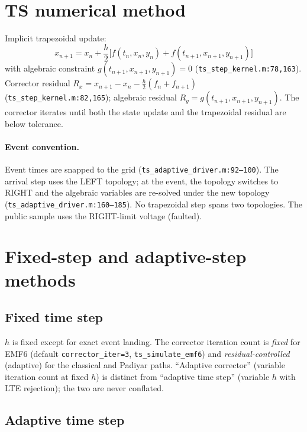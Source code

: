 \documentclass[12pt,a4paper]{article}
\begin{document}
\section{TS numerical method}

Implicit trapezoidal update:
\begin{equation}
x_{n+1}=x_n+\frac{h}{2}\bigl[f(t_n,x_n,y_n)+f(t_{n+1},x_{n+1},y_{n+1})\bigr]
\end{equation}
with algebraic constraint $g(t_{n+1},x_{n+1},y_{n+1})=0$
(\texttt{ts\_step\_kernel.m:78,163}).
Corrector residual $R_x=x_{n+1}-x_n-\frac{h}{2}(f_n+f_{n+1})$
(\texttt{ts\_step\_kernel.m:82,165}); algebraic residual
$R_g=g(t_{n+1},x_{n+1},y_{n+1})$. The corrector iterates until both the
state update and the trapezoidal residual are below tolerance.

\paragraph{Event convention.} Event times are snapped to the grid
(\texttt{ts\_adaptive\_driver.m:92--100}). The arrival step uses the LEFT
topology; at the event, the topology switches to RIGHT and the algebraic
variables are re-solved under the new topology
(\texttt{ts\_adaptive\_driver.m:160--185}). No trapezoidal step spans two
topologies. The public sample uses the RIGHT-limit voltage (faulted).

\section{Fixed-step and adaptive-step methods}

\subsection{Fixed time step}

$h$ is fixed except for exact event landing. The corrector iteration count is
\emph{fixed} for EMF6 (default \texttt{corrector\_iter=3},
\texttt{ts\_simulate\_emf6}) and \emph{residual-controlled} (adaptive) for the
classical and Padiyar paths. ``Adaptive corrector'' (variable iteration count
at fixed $h$) is distinct from ``adaptive time step'' (variable $h$ with LTE
rejection); the two are never conflated.

\subsection{Adaptive time step}
\end{document}
